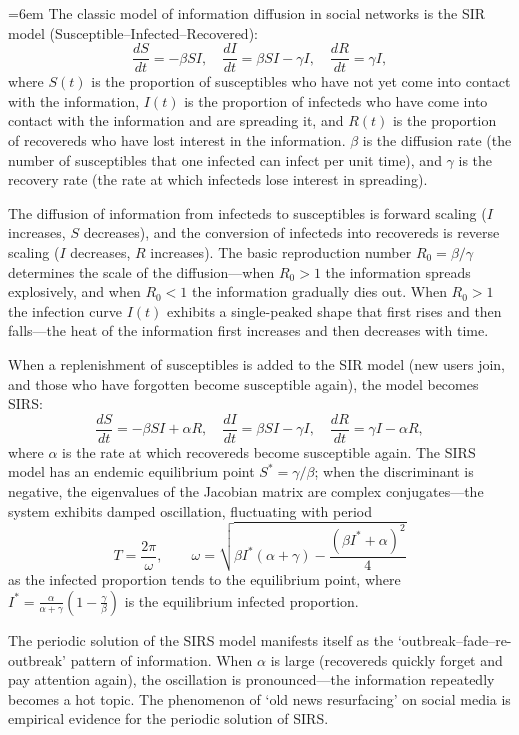 \begin{definition}\label{def:sir_model}
\emergencystretch=6em
The classic model of information diffusion in social networks is the SIR model (Susceptible--Infected--Recovered):
\[
\frac{dS}{dt} = -\beta S I, \quad \frac{dI}{dt} = \beta S I - \gamma I, \quad \frac{dR}{dt} = \gamma I,
\]
where $S(t)$ is the proportion of susceptibles who have not yet come into contact with the information, $I(t)$ is the proportion of infecteds who have come into contact with the information and are spreading it, and $R(t)$ is the proportion of recovereds who have lost interest in the information. $\beta$ is the diffusion rate (the number of susceptibles that one infected can infect per unit time), and $\gamma$ is the recovery rate (the rate at which infecteds lose interest in spreading).

The diffusion of information from infecteds to susceptibles is forward scaling ($I$ increases, $S$ decreases), and the conversion of infecteds into recovereds is reverse scaling ($I$ decreases, $R$ increases). The basic reproduction number $R_0 = \beta/\gamma$ determines the scale of the diffusion---when $R_0 > 1$ the information spreads explosively, and when $R_0 < 1$ the information gradually dies out. When $R_0 > 1$ the infection curve $I(t)$ exhibits a single-peaked shape that first rises and then falls---the heat of the information first increases and then decreases with time.
\end{definition}

\begin{proposition}\label{prop:sir_periodic}
When a replenishment of susceptibles is added to the SIR model (new users join, and those who have forgotten become susceptible again), the model becomes SIRS:
\[
\frac{dS}{dt} = -\beta S I + \alpha R, \quad \frac{dI}{dt} = \beta S I - \gamma I, \quad \frac{dR}{dt} = \gamma I - \alpha R,
\]
where $\alpha$ is the rate at which recovereds become susceptible again. The SIRS model has an endemic equilibrium point $S^* = \gamma/\beta$; when the discriminant is negative, the eigenvalues of the Jacobian matrix are complex conjugates---the system exhibits damped oscillation, fluctuating with period
\[
T = \frac{2\pi}{\omega}, \qquad \omega = \sqrt{\beta I^*(\alpha+\gamma) - \frac{(\beta I^*+\alpha)^2}{4}}
\]
as the infected proportion tends to the equilibrium point, where $I^* = \frac{\alpha}{\alpha+\gamma}\left(1-\frac{\gamma}{\beta}\right)$ is the equilibrium infected proportion.

The periodic solution of the SIRS model manifests itself as the `outbreak--fade--re-outbreak' pattern of information. When $\alpha$ is large (recovereds quickly forget and pay attention again), the oscillation is pronounced---the information repeatedly becomes a hot topic. The phenomenon of `old news resurfacing' on social media is empirical evidence for the periodic solution of SIRS.
\end{proposition}

